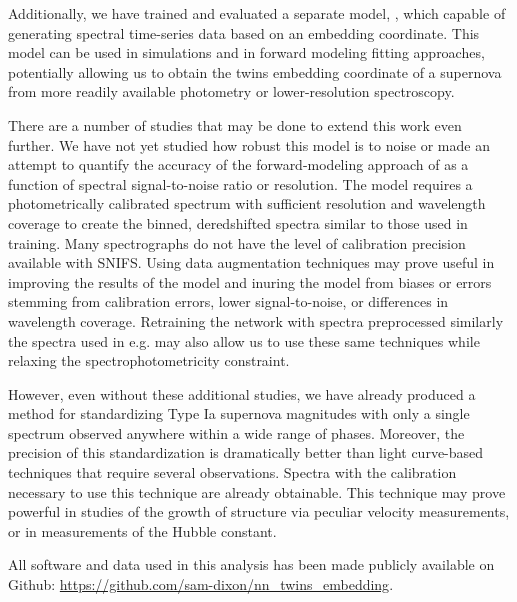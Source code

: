 Additionally, we have trained and evaluated a separate model, \etos, which capable of generating spectral time-series data based on an embedding coordinate. This model can be used in simulations and in forward modeling fitting approaches, potentially allowing us to obtain the twins embedding coordinate of a supernova from more readily available photometry or lower-resolution spectroscopy.

There are a number of studies that may be done to extend this work even further. We have not yet studied how robust this model is to noise or made an attempt to quantify the accuracy of the forward-modeling approach of \etos{} as a function of spectral signal-to-noise ratio or resolution. The \stoe{} model requires a photometrically calibrated spectrum with sufficient resolution and wavelength coverage to create the binned, deredshifted spectra similar to those used in training. Many spectrographs do not have the level of calibration precision available with SNIFS. Using data augmentation techniques may prove useful in improving the results of the model \citep{boone_avocado_2019} and inuring the model from biases or errors stemming from calibration errors, lower signal-to-noise, or differences in wavelength coverage. Retraining the network with spectra preprocessed similarly the spectra used in e.g. \citet{stahl_deepsip_2020} may also allow us to use these same techniques while relaxing the spectrophotometricity constraint.

However, even without these additional studies, we have already produced a method for standardizing Type Ia supernova magnitudes with only a single spectrum observed anywhere within a wide range of phases. Moreover, the precision of this standardization is dramatically better than light curve-based techniques that require several observations. Spectra with the calibration necessary to use this technique are already obtainable. This technique may prove powerful in studies of the growth of structure via peculiar velocity measurements, or in measurements of the Hubble constant.

All software and data used in this analysis has been made publicly available on Github: \url{https://github.com/sam-dixon/nn_twins_embedding}.
